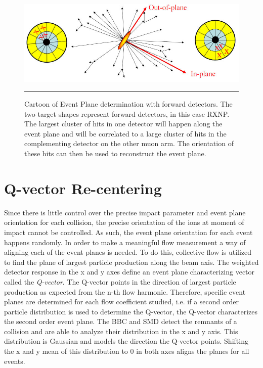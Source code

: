 \begin{figure}[htbp!]
  \centering
    \includegraphics[width=1\textwidth]{Figures/reactionplaneexpcartoon.jpg}
    \rule{35em}{0.5pt}
  \caption[Cartoon of Event Plane determination with forward detectors]{Cartoon of Event Plane determination with forward detectors. The two target shapes represent forward detectors, in this case RXNP. The largest cluster of hits in one detector will happen along the event plane and will be correlated to a large cluster of hits in the complementing detector on the other muon arm. The orientation of these hits can then be used to reconstruct the event plane. \citep{RXNPfocus}}
  \label{fig:rxnpexpcartoon}
\end{figure}



\section{Q-vector Re-centering}
Since there is little control over the precise impact parameter and event plane orientation for each collision, the precise orientation of the ions at moment of impact cannot be controlled. As such, the event plane orientation for each event happens randomly. In order to make a meaningful flow measurement a way of aligning each of the event planes is needed. To do this, collective flow is utilized to find the plane of largest particle production along the beam axis. The weighted detector response in the x and y axes define an event plane characterizing vector called the \textit{Q-vector}. The Q-vector points in the direction of largest particle production as expected from the n-th flow harmonic. Therefore, specific event planes are determined for each flow coefficient studied, i.e. if a second order particle distribution is used to determine the Q-vector, the Q-vector characterizes the second order event plane. The BBC and SMD detect the remnants of a collision and are able to analyze their distribution in the x and y axis. This distribution is Gaussian and models the direction the Q-vector points. Shifting the x and y mean of this distribution to 0 in both axes aligns the planes for all events.

